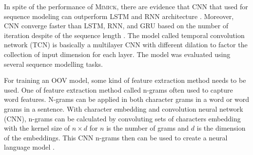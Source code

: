 In spite of the performance of \textsc{Mimick}, there are evidence
that CNN that used for sequence modeling can outperform LSTM and RNN
architecture \citep{empirical2018shaujie}. Moreover, CNN converge
faster than LSTM, RNN, and GRU based on the number of iteration
despite of the sequence length \citep{empirical2018shaujie}. The model
called temporal convolution network (TCN) is basically a multilayer
CNN with different dilation to factor the collection of input
dimension for each layer. The model was evaluated using several
sequence modelling tasks.

For training an OOV model, some kind of feature extraction method
needs to be used. One of feature extraction method called n-grams
often used to capture word features. N-grams can be applied in both
character grams in a word or word grams in a sentence. With character
embedding and convolution neural network (CNN), n-grams can be
calculated by convoluting sets of characters embedding with the kernel
size of $n \times d$ for $n$ is the number of grams and $d$ is the
dimension of the embeddings. This CNN n-grams then can be used to
create a neural language model \citep{character2015kim}.